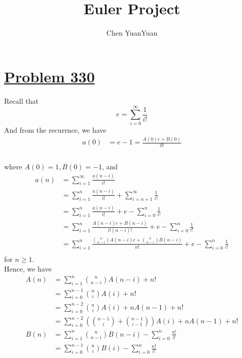 \documentclass{article}
\title{Euler Project}
\author{Chen YuanYuan}
\newcommand{\problemsection}[1]{\section{\href{https://projecteuler.net/problem=#1}{Problem #1}}}
\begin{document}
\maketitle
\problemsection{330}
Recall that  \\
\[
  e=\sum_{i=0}^{\infty}\frac{1}{i!}
\]
And from the recurrnce, we have \\
\begin{align*}
  a(0) & =e-1=\frac{A(0)e+B(0)}{0!} \\
\end{align*} \\
where $A(0)=1,B(0)=-1$, and \\
\begin{align*}
  a(n) & =\sum_{i=1}^{\infty}\frac{a(n-i)}{i!}                                                             \\
       & =\sum_{i=1}^{n}\frac{a(n-i)}{i!}+\sum_{i=n+1}^{\infty}\frac{1}{i!}                                \\
       & =\sum_{i=1}^{n}\frac{a(n-i)}{i!}+e-\sum_{i=0}^{n}\frac{1}{i!}                                     \\
       & =\sum_{i=1}^{n}\frac{A(n-i)e+B(n-i)}{i!(n-i)!}+e-\sum_{i=0}^{n}\frac{1}{i!}                       \\
       & =\sum_{i=1}^{n}\frac{\binom{n}{n-i}A(n-i)e+\binom{n}{n-i}B(n-i)}{n!}+e-\sum_{i=0}^{n}\frac{1}{i!} \\
\end{align*}
for $n\geq 1$.\\
Hence, we have
\begin{align*}
  A(n) & =\sum_{i=1}^{n}\binom{n}{n-i}A(n-i)+n!                            \\
       & =\sum_{i=0}^{n-1}\binom{n}{i}A(i)+n!                              \\
       & =\sum_{i=0}^{n-2}\binom{n}{i}A(i)+nA(n-1)+n!                      \\
       & =\sum_{i=0}^{n-2}(\binom{n-1}{i}+\binom{n-1}{i-1})A(i)+nA(n-1)+n! \\
  B(n) & =\sum_{i=1}^{n}\binom{n}{n-i}B(n-i)-\sum_{i=0}^{n}\frac{n!}{i!}   \\
       & =\sum_{i=0}^{n-1}\binom{n}{i}B(i)-\sum_{i=0}^{n}\frac{n!}{i!}     \\
\end{align*} \\
\end{document}

